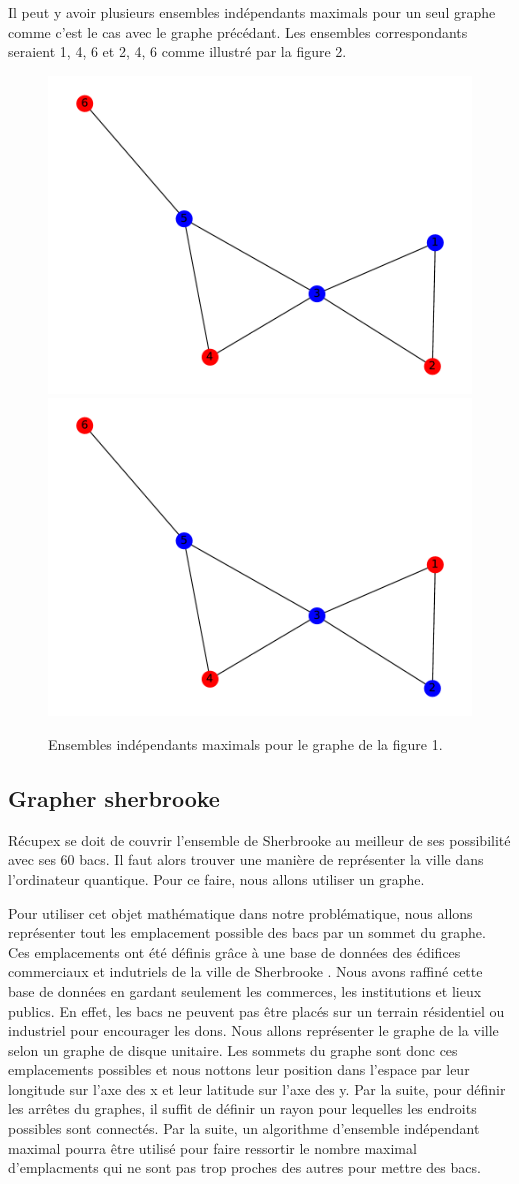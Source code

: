 \documentclass[11pt]{article}
\begin{document}
Il peut y avoir plusieurs ensembles indépendants maximals pour un seul graphe comme c'est le cas avec le graphe précédant. Les ensembles correspondants seraient {1, 4, 6} et {2, 4, 6} comme illustré par la figure 2.

\begin{figure}[H]
    \centering
    \includegraphics[width=0.4\linewidth]{images/graphe_MIS_1.pdf}
    \includegraphics[width=0.4\linewidth]{images/graphe_MIS_2.pdf}
    \caption{Ensembles indépendants maximals pour le graphe de la figure 1.}
    \label{MIS_exemple}
\end{figure}



\subsection{Grapher sherbrooke}
Récupex se doit de couvrir l'ensemble de Sherbrooke au meilleur de ses possibilité avec ses 60 bacs. Il faut alors trouver une manière de représenter la ville dans l'ordinateur quantique. Pour ce faire,  nous allons utiliser un graphe. 

Pour utiliser cet objet mathématique dans notre problématique, nous allons représenter tout les emplacement possible des bacs par un sommet du graphe. Ces emplacements ont été définis grâce à une base de données des édifices commerciaux et indutriels de la ville de Sherbrooke \cite{noauthor_repertoire_nodate}. Nous avons raffiné cette base de données en gardant seulement les commerces, les institutions et lieux publics. En effet, les bacs ne peuvent pas être placés sur un terrain résidentiel ou industriel pour encourager les dons. Nous allons représenter le graphe de la ville selon un graphe de disque unitaire. Les sommets du graphe sont donc ces emplacements possibles et nous nottons leur position dans l'espace par leur longitude sur l'axe des x et leur latitude sur l'axe des y. Par la suite, pour définir les arrêtes du graphes, il suffit de définir un rayon pour lequelles les endroits possibles sont connectés. Par la suite, un algorithme d'ensemble indépendant maximal pourra être utilisé pour faire ressortir le nombre maximal d'emplacments qui ne sont pas trop proches des autres pour mettre des bacs.
\end{document}
